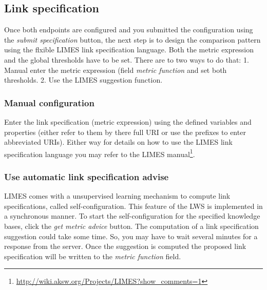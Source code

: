 \documentclass{article}
\begin{document}
\subsection{Link specification}
Once both endpoints are configured and you submitted the configuration using the \textit{submit specification}  button, the next step is to design the comparison pattern using the flxible LIMES link specification language. Both the metric expression and the global thresholds have to be set. There are to two ways to do that: 1. Manual enter the metric expression (field \textit{metric function} and set both thresholds. 2. Use the LIMES suggestion function.\\
\subsubsection{Manual configuration}
Enter the link specification (metric expression) using the defined variables and properties (either refer to them by there full URI or use the prefixes to enter abbreviated URIs). Either way for details on how to use the LIMES link specification language you may refer to the LIMES manual\footnote{\url{http://wiki.aksw.org/Projects/LIMES?show_comments=1}}.
\subsubsection{Use automatic link specification advise}
LIMES comes with a unsupervised learning mechanism to compute link specifications, called self-configuration. This feature of the LWS is implemented in a synchronous manner. To start the self-configuration for the specified knowledge bases, click the \textit{get metric advice} button. The computation of a link specification suggestion could take some time. So, you may have to wait several minutes for a response from the server. Once the suggestion is computed the proposed link specification will be written to the \textit{metric function} field.
\end{document}
